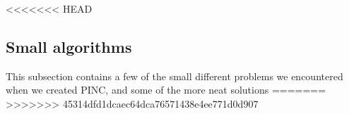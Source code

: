 <<<<<<< HEAD
\subsection{Small algorithms}
	This subsection contains a few of the small different problems we encountered when we
 	created PINC, and some of the more neat solutions
=======
>>>>>>> 45314dfd1dcaec64dca76571438e4ee771d0d907
